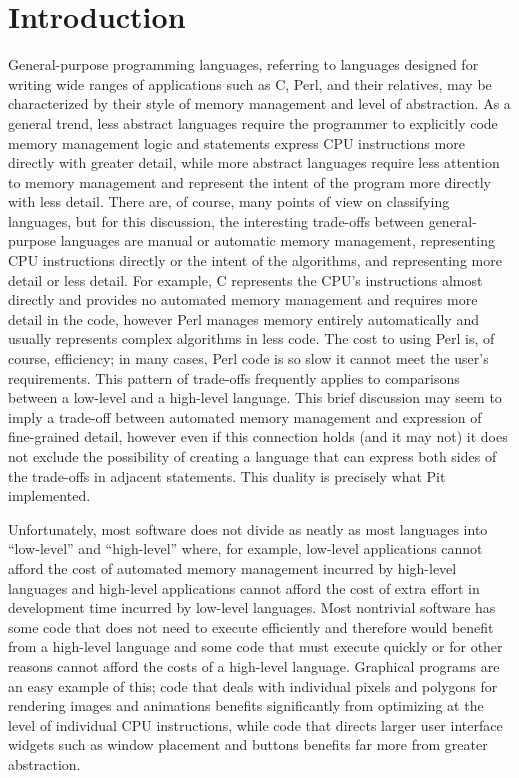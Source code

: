 \section{Introduction}

General-purpose programming languages, referring to languages designed for writing wide ranges of applications such as
C, Perl, and their relatives, may be characterized by their style of memory management and level of abstraction.  As a
general trend, less abstract languages require the programmer to explicitly code memory management logic and statements
express CPU instructions more directly with greater detail, while more abstract languages require less attention to
memory management and represent the intent of the program more directly with less detail.  There are, of course, many
points of view on classifying languages, but for this discussion, the interesting trade-offs between general-purpose
languages are manual or automatic memory management, representing CPU instructions directly or the intent of the
algorithms, and representing more detail or less detail.  For example, C represents the CPU's instructions almost
directly and provides no automated memory management and requires more detail in the code, however Perl manages memory
entirely automatically and usually represents complex algorithms in less code.  The cost to using Perl is, of course,
efficiency; in many cases, Perl code is so slow it cannot meet the user's requirements.  This pattern of trade-offs
frequently applies to comparisons between a low-level and a high-level language.  This brief discussion may seem to
imply a trade-off between automated memory management and expression of fine-grained detail, however even if this
connection holds (and it may not) it does not exclude the possibility of creating a language that can express both
sides of the trade-offs in adjacent statements.  This duality is precisely what Pit implemented.

Unfortunately, most software does not divide as neatly as most languages into ``low-level'' and ``high-level'' where,
for example, low-level applications cannot afford the cost of automated memory management incurred by high-level
languages and high-level applications cannot afford the cost of extra effort in development time incurred by low-level
languages.  Most nontrivial software has some code that does not need to execute efficiently and therefore would
benefit from a high-level language and some code that must execute quickly or for other reasons cannot afford the costs
of a high-level language.  Graphical programs are an easy example of this; code that deals with individual pixels and
polygons for rendering images and animations benefits significantly from optimizing at the level of individual CPU
instructions, while code that directs larger user interface widgets such as window placement and buttons benefits far
more from greater abstraction.

